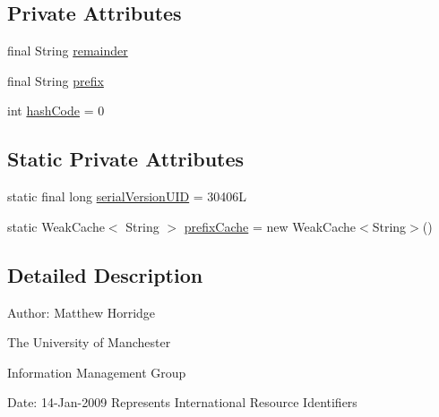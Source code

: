 \subsection*{Private Attributes}
\begin{DoxyCompactItemize}
\item 
final String \hyperlink{classorg_1_1semanticweb_1_1owlapi_1_1model_1_1_i_r_i_a51edec49810ba85d08fa247e1ebcbe76}{remainder}
\item 
final String \hyperlink{classorg_1_1semanticweb_1_1owlapi_1_1model_1_1_i_r_i_ae212f6c771cdd6c681af5d027f4a21de}{prefix}
\item 
int \hyperlink{classorg_1_1semanticweb_1_1owlapi_1_1model_1_1_i_r_i_aa8abecb94ac3a2d211d80641525ce519}{hash\-Code} = 0
\end{DoxyCompactItemize}
\subsection*{Static Private Attributes}
\begin{DoxyCompactItemize}
\item 
static final long \hyperlink{classorg_1_1semanticweb_1_1owlapi_1_1model_1_1_i_r_i_a0d6984c8954eeafa302d2fc7bc4f9e10}{serial\-Version\-U\-I\-D} = 30406\-L
\item 
static Weak\-Cache$<$ String $>$ \hyperlink{classorg_1_1semanticweb_1_1owlapi_1_1model_1_1_i_r_i_ac86b51e5b7824007729502332723837b}{prefix\-Cache} = new Weak\-Cache$<$String$>$()
\end{DoxyCompactItemize}


\subsection{Detailed Description}
Author\-: Matthew Horridge\par
 The University of Manchester\par
 Information Management Group\par
 Date\-: 14-\/\-Jan-\/2009 Represents International Resource Identifiers 

